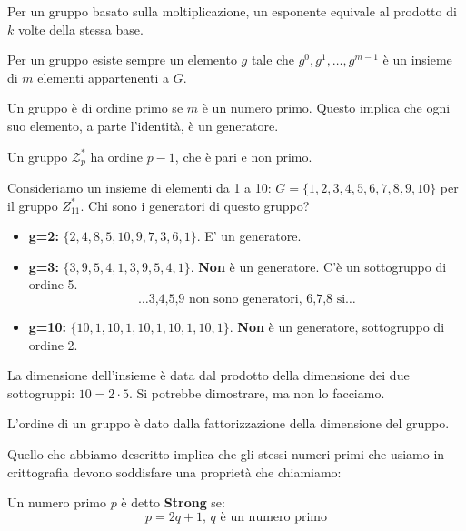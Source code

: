 Per un gruppo basato sulla moltiplicazione, un esponente equivale al prodotto di $k$ volte della stessa base. 
\begin{definition}
Per un gruppo esiste sempre un elemento $g$ tale che ${g^0,g^1,\dots,g^{m-1}}$ è un insieme di $m$ elementi appartenenti a $G$.\\
\begin{property}
Un gruppo è di ordine primo se $m$ è un numero primo. Questo implica che ogni suo elemento, a parte l'identità, è un generatore.
\end{property}
\begin{remark}
Un gruppo $\mathcal{Z}_p^*$ ha ordine $p-1$, che è pari e non primo.
\end{remark}
\end{definition}
\begin{example}[ $Z_{11}^*$]
Consideriamo un insieme di elementi da 1 a 10: $G=\{1,2,3,4,5,6,7,8,9,10\}$ per il gruppo $Z_{11}^*$. Chi sono i generatori di questo gruppo?
\begin{itemize}
    \item \textbf{g=2:} $\{2,4,8,5,10,9,7,3,6,1\}$. E' un generatore.
    \item \textbf{g=3:} $\{3,9,5,4,1,3,9,5,4,1\}$. \textbf{Non} è un generatore. C'è un sottogruppo di ordine 5.
    \[\dots \text{3,4,5,9 non sono generatori, 6,7,8 si}\dots\]
    \item \textbf{g=10:} $\{10,1,10,1,10,1,10,1,10,1\}$. \textbf{Non} è un generatore, sottogruppo di ordine 2.
\end{itemize}
\begin{remark}
La dimensione dell'insieme è data dal prodotto della dimensione dei due sottogruppi: $10=2\cdot5$. Si potrebbe dimostrare, ma non lo facciamo.
\end{remark}
\label{exam:grouporder}
\end{example}
\begin{theorem}
L'ordine di un gruppo è dato dalla fattorizzazione della dimensione del gruppo.
\end{theorem}
Quello che abbiamo descritto implica che gli stessi numeri primi che usiamo in crittografia devono soddisfare una proprietà che chiamiamo:
\begin{definition}
Un numero primo $p$ è detto \textbf{Strong} se:
\begin{equation}\label{eq:strongp}
    p=2q+1,\,q\text{ è un numero primo}
\end{equation}
\end{definition}
